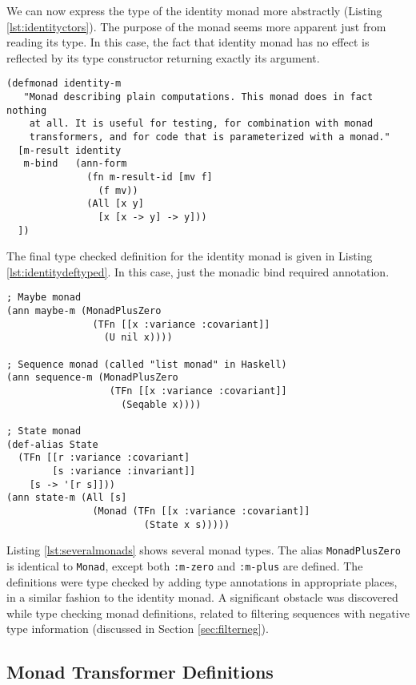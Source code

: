We can now express the type of the identity monad more abstractly (Listing \ref{lst:identityctors}).
The purpose of the monad seems more apparent just from reading its type.
In this case, the fact that identity monad has no effect is reflected
by its type constructor returning exactly its argument.

\begin{lstlisting}[caption=Type checked identity monad definition, label=lst:identitydeftyped]
(defmonad identity-m
   "Monad describing plain computations. This monad does in fact nothing
    at all. It is useful for testing, for combination with monad
    transformers, and for code that is parameterized with a monad."
  [m-result identity
   m-bind   (ann-form
              (fn m-result-id [mv f]
                (f mv))
              (All [x y]
                [x [x -> y] -> y]))
  ])
\end{lstlisting}

The final type checked definition for the identity monad is given in Listing \ref{lst:identitydeftyped}.
In this case, just the monadic bind required annotation.

\begin{lstlisting}[caption=Several monad types, label=lst:severalmonads]
; Maybe monad
(ann maybe-m (MonadPlusZero
               (TFn [[x :variance :covariant]] 
                 (U nil x))))

; Sequence monad (called "list monad" in Haskell)
(ann sequence-m (MonadPlusZero 
                  (TFn [[x :variance :covariant]]
                    (Seqable x))))

; State monad
(def-alias State
  (TFn [[r :variance :covariant]
        [s :variance :invariant]]
    [s -> '[r s]]))
(ann state-m (All [s]
               (Monad (TFn [[x :variance :covariant]]
                        (State x s)))))
\end{lstlisting}

Listing \ref{lst:severalmonads} shows several monad types. The alias \lstinline|MonadPlusZero|
is identical to \lstinline|Monad|, except both \lstinline|:m-zero| and \lstinline|:m-plus| are defined.
The definitions were type checked by adding type annotations in appropriate places, in a similar fashion
to the identity monad. A significant obstacle was discovered while type checking monad definitions,
related to filtering sequences with negative type information (discussed in Section \ref{sec:filterneg}).

\subsection{Monad Transformer Definitions}

